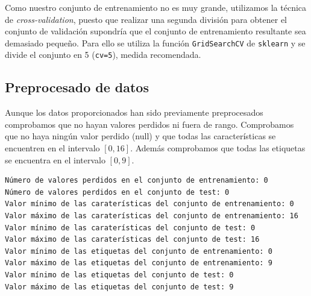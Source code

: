 \documentclass[size=a4, parskip=half, titlepage=false, toc=flat, toc=bib, 12pt]{scrartcl}
\begin{document}
Como nuestro conjunto de entrenamiento no es muy grande, utilizamos la técnica de \textit{cross-validation}, puesto que realizar una segunda división para obtener el conjunto de validación supondría que el conjunto de entrenamiento resultante sea demasiado pequeño. Para ello se utiliza la función \verb|GridSearchCV| de \verb|sklearn| y se divide el conjunto en 5 (\verb|cv=5|), medida recomendada.

\subsection{Preprocesado de datos}
Aunque los datos proporcionados han sido previamente preprocesados comprobamos que no hayan valores perdidos ni fuera de rango. Comprobamos que no haya ningún valor perdido (null) y que todas las características se encuentren en el intervalo $[0,16]$. Además comprobamos que todas las etiquetas se encuentra en el intervalo $[0,9]$.

\begin{verbatim}
Número de valores perdidos en el conjunto de entrenamiento: 0
Número de valores perdidos en el conjunto de test: 0
Valor mínimo de las caraterísticas del conjunto de entrenamiento: 0
Valor máximo de las caraterísticas del conjunto de entrenamiento: 16
Valor mínimo de las caraterísticas del conjunto de test: 0
Valor máximo de las caraterísticas del conjunto de test: 16
Valor mínimo de las etiquetas del conjunto de entrenamiento: 0
Valor máximo de las etiquetas del conjunto de entrenamiento: 9
Valor mínimo de las etiquetas del conjunto de test: 0
Valor máximo de las etiquetas del conjunto de test: 9
\end{verbatim}
\end{document}
